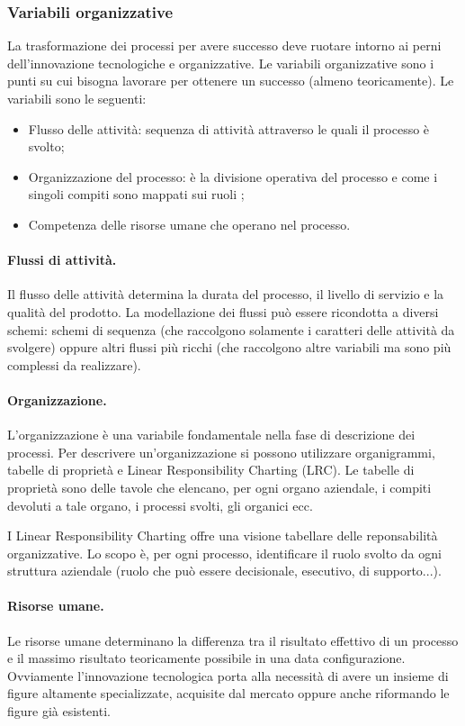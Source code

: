 \documentclass[a4paper, 11pt]{article}
\begin{document}
	\subsubsection{Variabili organizzative}
	La trasformazione dei processi per avere successo deve ruotare intorno ai perni dell'innovazione tecnologiche e organizzative. Le variabili organizzative sono i punti su cui bisogna lavorare per ottenere un successo (almeno teoricamente). Le variabili sono le seguenti: \begin{itemize}
		\item Flusso delle attività: sequenza di attività attraverso le quali il processo è svolto;
		\item Organizzazione del processo: è la divisione operativa del processo e come i singoli compiti sono mappati sui ruoli ;
		\item Competenza delle risorse umane che operano nel processo.
	\end{itemize}
	
	\paragraph{Flussi di attività.} Il flusso delle attività determina la durata del processo, il livello di servizio e la qualità del prodotto. La modellazione dei flussi può essere ricondotta a diversi schemi: schemi di sequenza (che raccolgono solamente i caratteri delle attività da svolgere) oppure altri flussi più ricchi (che raccolgono altre variabili ma sono più complessi da realizzare).
	
	\paragraph{Organizzazione.} L'organizzazione è una variabile fondamentale nella fase di descrizione dei processi. Per descrivere un'organizzazione si possono utilizzare organigrammi, tabelle di proprietà e Linear Responsibility Charting (LRC). Le tabelle di proprietà sono delle tavole che elencano, per ogni organo aziendale, i compiti devoluti a tale organo, i processi svolti, gli organici ecc.
	
	I Linear Responsibility Charting offre una visione tabellare delle reponsabilità organizzative. Lo scopo è, per ogni processo, identificare il ruolo svolto da ogni struttura aziendale (ruolo che può essere decisionale, esecutivo, di supporto...). 
	
	\paragraph{Risorse umane.} Le risorse umane determinano la differenza tra il risultato effettivo di un processo e il massimo risultato teoricamente possibile in una data configurazione. Ovviamente l'innovazione tecnologica porta alla necessità di avere un insieme di figure altamente specializzate, acquisite dal mercato oppure anche riformando le figure già esistenti.
	
\end{document}

